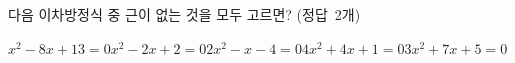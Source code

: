 다음 이차방정식 중 근이 없는 것을 모두 고르면? \mbox{(정답 2개)}
\begin{choicesii}{$x^2-8x+13=0$}{$x^2-2x+2=0$}{$2x^2-x-4=0$}{$4x^2+4x+1=0$}{$3x^2+7x+5=0$}\end{choicesii}
